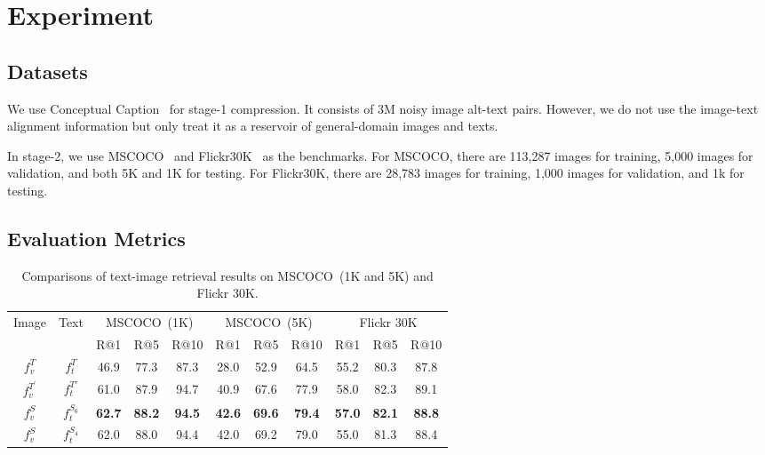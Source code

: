 \section{Experiment}
\subsection{Datasets}
We use Conceptual Caption~\cite{cc} for stage-1 compression. 
It consists of 3M noisy image alt-text pairs. 
However, we do not use the image-text alignment information 
but only treat it as a reservoir of general-domain images and texts.

In stage-2, we use MSCOCO~\cite{coco} and Flickr30K~\cite{flickr} as the benchmarks. For MSCOCO, there are 113,287 images for training, 5,000 images for validation, and both 5K and 1K for testing. For Flickr30K, there are 28,783 images for training, 1,000 images for validation, and 1k for testing.

\subsection{Evaluation Metrics}

\begin{table*}[t!]
	
	\centering
	\small
	
	\begin{tabular}{cc|ccccccccc}
		
		\toprule
		
		\multirow{2}{*}{Image}&\multirow{2}{*}{Text} & \multicolumn{3}{c}{MSCOCO~(1K)} &\multicolumn{3}{c}{MSCOCO~(5K)}  &\multicolumn{3}{c}{Flickr 30K}  \\
		
		&  &R@1 &R@5  &R@10  &R@1  &R@5  &R@10 &R@1  &R@5  &R@10 \\
		
		\cline{1-11}
		
		
		$f_v^{T}$ & $f_t^{T}$ &46.9  &77.3  &87.3   &28.0  &52.9  &64.5  & 55.2 &80.3  &87.8 \\
		
		$f_v^{T^\prime}$ & $f_t^{T\prime}$ &61.0 &87.9 &94.7 &40.9 &67.6  &77.9 &58.0  &82.3 &89.1  \\
		
		\cline{1-11}
				$f_v^{S}$ & $f_t^{S_6}$ &\textbf{62.7} &\textbf{88.2} &\textbf{94.5} &\textbf{42.6} &\textbf{69.6} &\textbf{79.4} &\textbf{57.0} &\textbf{82.1}  &\textbf{88.8}\\
				$f_v^{S}$ & $f_t^{S_4}$ &62.0&88.0 &94.4 &42.0 &69.2 &79.0  &55.0  &81.3  &88.4\\
		\bottomrule
	\end{tabular}
	\caption{Comparisons of text-image retrieval results on MSCOCO~(1K and 5K) and Flickr 30K.}
	\label{table:main}
\end{table*}

